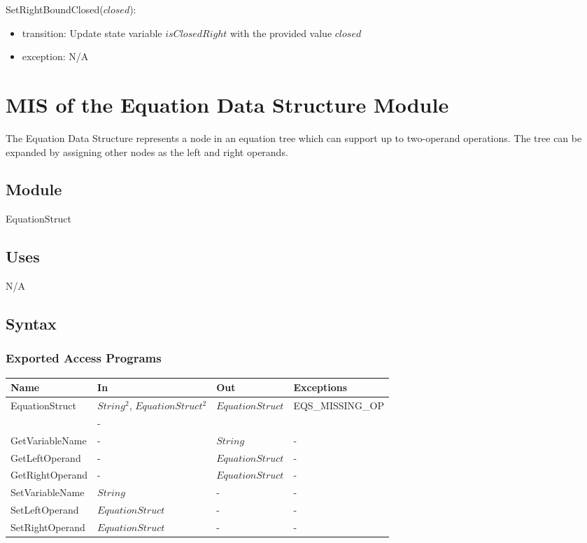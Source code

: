 \documentclass[12pt, titlepage]{article}
\begin{document}
\noindent SetRightBoundClosed($closed$):
\begin{itemize}
	\item transition: Update state variable $isClosedRight$ with the provided 
	value $closed$
	\item exception: N/A
\end{itemize}

\newpage

\section{MIS of the Equation Data Structure Module} 
\label{Module_equationdatastructure}
The Equation Data Structure represents a node in an equation tree which can 
support up to two-operand operations. The tree can be expanded by assigning 
other nodes as the left and right operands.

\subsection{Module}

EquationStruct

\subsection{Uses}

N/A

\subsection{Syntax}

\subsubsection{Exported Access Programs}

\begin{center}
	\begin{tabular}{p{3cm} p{3cm} p{3cm} p{5cm}}
		\hline
		\textbf{Name} & \textbf{In} & \textbf{Out} & \textbf{Exceptions} \\
		\hline
		\multirow{2}{3cm}{EquationStruct} & $String^2$, $EquationStruct^2$ & 
		\multirow{2}{3cm}{$EquationStruct$} & 
		\multirow{2}{5cm}{EQS\_MISSING\_OP}\\
		GetOperator & - & $String$ & - \\
		GetVariableName & - & $String$ & - \\
		GetLeftOperand & - & $EquationStruct$ & -\\
		GetRightOperand & - & $EquationStruct$ & - \\
		SetVariableName & $String$ & - & - \\
		SetLeftOperand & $EquationStruct$ & - & - \\
		SetRightOperand & $EquationStruct$ & - & - \\
		\hline
	\end{tabular}
\end{center}
\end{document}
